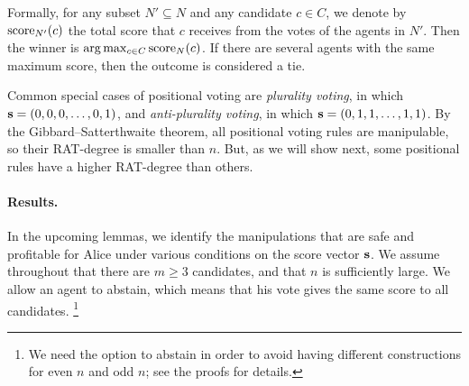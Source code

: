 Formally, for any subset $N'\subseteq N$ and any candidate $c\in C$, we denote by $\operatorname{score}_{N'}(c)$ the total score that $c$ receives from the votes of the agents in $N'$. Then the winner is $\arg\max_{c\in C}\operatorname{score}_N(c)$. If there are several agents with the same maximum score, then the outcome is considered a tie.

Common special cases of positional voting are \emph{plurality voting}, in which $\mathbf{s} = (0,0,0,\ldots,0,1)$, and 
\emph{anti-plurality voting}, in which $\mathbf{s} = (0,1,1,\ldots,1,1)$.
By the Gibbard--Satterthwaite theorem, all positional voting rules are manipulable, so their RAT-degree is smaller than $n$.
But, as we will show next, some positional rules have a higher RAT-degree than others.

\paragraph{Results.} 

In the upcoming lemmas, we identify the manipulations that are safe and profitable for Alice under various conditions on the score vector $\mathbf{s}$. We assume throughout that there are $m\geq 3$ candidates, and that $n$ is sufficiently large.
We allow an agent to abstain, which means that his vote gives the same score to all candidates.%
\footnote{
We need the option to abstain in order to avoid having different constructions for even $n$ and odd $n$; see the proofs for details.
}


